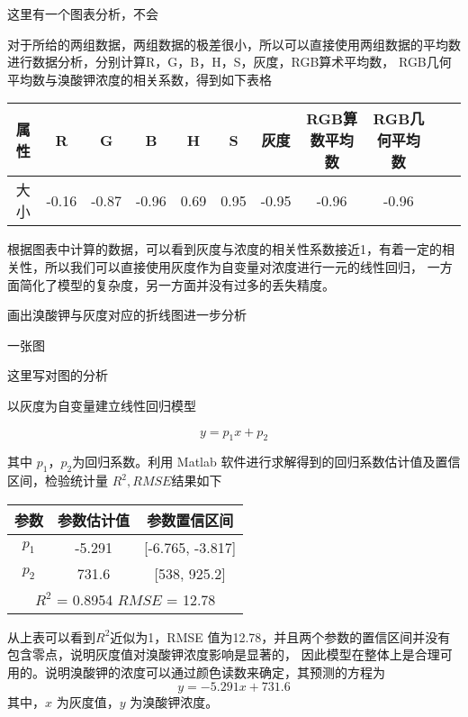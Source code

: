     这里有一个图表分析，不会

    对于所给的两组数据，两组数据的极差很小，所以可以直接使用两组数据的平均数进行数据分析，分别计算R，G，B，H，S，灰度，RGB算术平均数，
    RGB几何平均数与溴酸钾浓度的相关系数，得到如下表格

    \begin{table}[H]
        \centering
        \begin{tabular}{|c|c|c|c|c|c|c|c|c|c|c|}
            \hline
            属性 & R & G & B & H & S & 灰度 & RGB算数平均数 & RGB几何平均数 \\
            \hline
            大小 & -0.16 & -0.87 & -0.96 & 0.69 & 0.95 & -0.95 & -0.96 & -0.96 \\
            \hline
        \end{tabular}
    \end{table}


    根据图表中计算的数据，可以看到灰度与浓度的相关性系数接近1，有着一定的相关性，所以我们可以直接使用灰度作为自变量对浓度进行一元的线性回归，
    一方面简化了模型的复杂度，另一方面并没有过多的丢失精度。
    
    画出溴酸钾与灰度对应的折线图进一步分析

    一张图

    这里写对图的分析

    以灰度为自变量建立线性回归模型

    $$ y = p_1 x + p_2$$

    其中 $p_{1}，p_{2}$为回归系数。利用 Matlab 软件进行求解得到的回归系数估计值及置信区间，检验统计量 $R^2, RMSE $结果如下

    \begin{table}[H]
        \centering
        \begin{tabular}{|c|c|c|}
            \hline
            参数     & 参数估计值  & 参数置信区间        \\ 
            \hline
            $p_1$  & -5.291 & [-6.765, -3.817] \\
            \hline
            $p_2$  & 731.6 & [538, 925.2]   \\
            \hline
            \multicolumn{3}{|c|}{$R^2$ = 0.8954 $RMSE$ = 12.78}  \\                                            
            \hline
        \end{tabular}
        \end{table}
    
    从上表可以看到$R^2$近似为1，RMSE 值为12.78，并且两个参数的置信区间并没有包含零点，说明灰度值对溴酸钾浓度影响是显著的，
    因此模型在整体上是合理可用的。说明溴酸钾的浓度可以通过颜色读数来确定，其预测的方程为
    $$ y = -5.291 x + 731.6 $$ 
    其中，$x$ 为灰度值，$y$ 为溴酸钾浓度。

